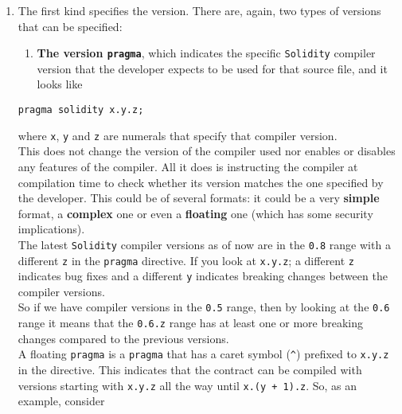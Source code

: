 \begin{enumerate}
\def\labelenumi{\arabic{enumi}.}
\item
  The first kind specifies the version. There are, again, two types of
  versions that can be specified:\\

  \begin{enumerate}
  \def\labelenumii{\alph{enumii}.}
  \tightlist
  \item
    \textbf{The version \texttt{pragma}}, which indicates the specific
    \texttt{Solidity} compiler version that the developer expects to be
    used for that source file, and it looks like\\
  \end{enumerate}

  \begin{lstlisting}[language=Solidity,numbers=none]
  pragma solidity x.y.z;
  \end{lstlisting}

  where \texttt{x}, \texttt{y} and \texttt{z} are numerals that specify
  that compiler version.\\

  This does not change the version of the compiler used nor enables or
  disables any features of the compiler. All it does is instructing the
  compiler at compilation time to check whether its version matches the
  one specified by the developer. This could be of several formats: it
  could be a very \textbf{simple} format, a \textbf{complex} one or even
  a \textbf{floating} one (which has some security implications).\\

  The latest \texttt{Solidity} compiler versions as of now are in the
  \texttt{0.8} range with a different \texttt{z} in the \texttt{pragma}
  directive. If you look at \texttt{x.y.z}; a different \texttt{z}
  indicates bug fixes and a different \texttt{y} indicates breaking
  changes between the compiler versions.\\

  So if we have compiler versions in the \texttt{0.5} range, then by
  looking at the \texttt{0.6} range it means that the \texttt{0.6.z}
  range has at least one or more breaking changes compared to the
  previous versions.\\

  A floating \texttt{pragma} is a \texttt{pragma} that has a caret
  symbol (\texttt{\^{}}) prefixed to \texttt{x.y.z} in the directive.
  This indicates that the contract can be compiled with versions
  starting with \texttt{x.y.z} all the way until \texttt{x.(y\ +\ 1).z}.
  So, as an example, consider\\


\end{enumerate}
